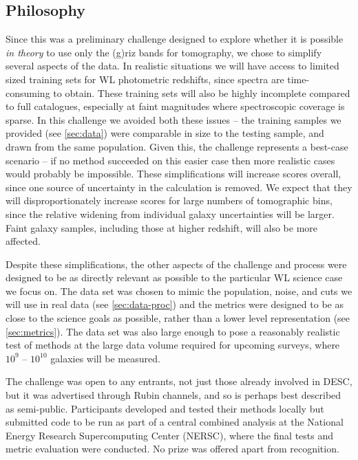 \documentclass[twocolumn,twocolappendix]{aastex63}
\begin{document}
\subsection{Philosophy}

Since this was a preliminary challenge designed to explore whether it is possible \emph{in theory}
to use only the (g)riz bands for tomography, we chose to simplify several aspects of the data.  In realistic 
situations we will have access to limited sized training sets for WL photometric redshifts, since 
spectra are time-consuming to obtain.  These training sets will also be highly incomplete compared
to full catalogues, especially at faint magnitudes where spectroscopic coverage is sparse.  In this
challenge we avoided both these issues -- the training samples we provided (see \autoref{sec:data}) were comparable
in size to the testing sample, and drawn from the same population.  Given this, the challenge
represents a best-case scenario -- if no method succeeded on this easier case then more realistic
cases would probably be impossible.
These simplifications will increase scores overall, since one source of uncertainty in the calculation
is removed. We expect that they will disproportionately increase scores for large numbers of
tomographic bins, since the relative widening from individual galaxy uncertainties will be larger. Faint
galaxy samples, including those at higher redshift, will also be more affected.

Despite these simplifications, the other aspects of the challenge and process were designed to be
as directly relevant as possible to the particular WL science case we focus on.  The data set
was chosen to mimic the population, noise, and cuts we will use in real data (see \autoref{sec:data-proc}) 
and the metrics were designed to be as close to the science goals as possible, rather than a lower
level representation (see \autoref{sec:metrics}). The data set was also large enough to pose a 
reasonably realistic test of methods at the large data volume required for upcoming surveys, where
$10^9$ -- $10^{10}$ galaxies will be measured.

The challenge was open to any entrants, not just those already involved in DESC, but it was
advertised through Rubin channels, and so is perhaps best described as semi-public.
Participants developed and tested their methods locally but submitted code to be run as part of a central
combined analysis at the National Energy Research
Supercomputing Center (NERSC), where the final tests and metric evaluation were conducted.  No prize was offered apart from recognition.
\end{document}
